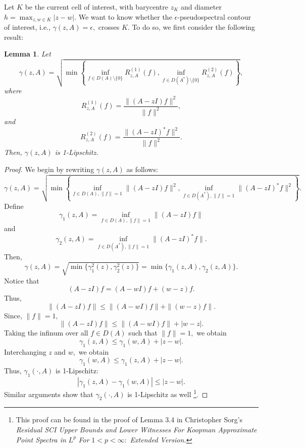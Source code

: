 \documentclass[12pt,a4paper]{article}
\theoremstyle{boldthm}
\newtheorem{lemma}[theorem]{Lemma}
\theoremstyle{bolddefn}
\begin{document}
Let $K$ be the current cell of interest, with barycentre $z_K$ and diameter $h = \max_{z, w \in K} |z-w|.$ We want to know whether the $\epsilon$-pseudospectral contour of interest, i.e., $\gamma(z, A) = \epsilon,$ crosses $K.$ To do so, we first consider the following result:
\begin{lemma}
    Let $$
    \gamma(z, A) = \sqrt{ \min \left\{ \inf_{f \in D(A) \setminus \{0\}} R_{z, A}^{(1)}(f) , \inf_{f \in D(A^*) \setminus \{0\}} R_{z, A}^{(2)}(f) \right\}},$$
    where
    $$
    R_{z, A}^{(1)}(f) = \frac{\| (A-zI) f \|^2}{\|f\|^2}, $$
    and 
    $$R_{z, A}^{(2)}(f) = \frac{\| (A-zI)^* f \|^2}{\|f\|^2}.$$
    Then, $\gamma(z, A)$ is 1-Lipschitz.
\end{lemma}
\begin{proof} 
    We begin by rewriting $\gamma(z, A)$ as follows:
    \begin{equation}
    \gamma(z, A) = \sqrt{ \min \left\{ \inf_{f \in D(A), \|f\|=1} \|(A-zI) f \|^2 , \inf_{f \in D(A^*), \|f\|=1} \|(A-zI)^*f\|^2 \right\}}. 
    \end{equation}
    Define
    \begin{equation}
    \gamma_1(z, A) = \inf_{f \in D(A), \|f\|=1} \|(A-zI) f \|
    \end{equation}
    and 
    \begin{equation}
    \gamma_2(z, A) = \inf_{f \in D(A^*), \|f\|=1} \|(A-zI)^*f\|.
    \end{equation}
    Then, 
    \begin{equation} \gamma(z, A) = \sqrt{ \min\{ \gamma_1^2(z), \gamma_2^2(z)\}} = \min\{ \gamma_1(z, A), \gamma_2(z, A)\}.\end{equation}
    Notice that 
    \begin{equation}
        (A-zI)f = (A-wI)f + (w-z)f.
    \end{equation}
    Thus, 
    \begin{equation}
        \|(A-zI)f\| \le \|(A-wI) f \| + \|(w-z) f \|.
    \end{equation}
    Since, $\|f\|=1,$ 
    \begin{equation}
        \|(A-zI)f\| \le \|(A-wI) f \| + |w-z|.
    \end{equation}
    Taking the infinum over all $f \in D(A)$ such that $\|f\|=1,$ we obtain
    \begin{equation} \label{g1w}
        \gamma_1(z, A) \le \gamma_1(w, A) + |z-w|.
    \end{equation}
    Interchanging $z$ and $w,$ we obtain
    \begin{equation}
        \gamma_1(w, A) \le \gamma_1(z, A) + |z-w|.
    \end{equation}
    Thus, $\gamma_1(\cdot, A)$ is 1-Lipschitz:
    \begin{equation}
        | \gamma_1(z, A) - \gamma_1(w, A) | \le |z-w|.
    \end{equation}
    Similar arguments show that $\gamma_2(\cdot, A)$ is 1-Lipschitz as well \footnote{This proof can be found in the proof of Lemma 3.4 in Christopher Sorg's \textit{Residual SCI Upper Bounds and Lower Witnesses For Koopman Approximate Point Spectra in} $L^p$ \textit{For} $1 < p < \infty:$ \textit{ Extended Version.}}. 


\end{proof}
\end{document}
